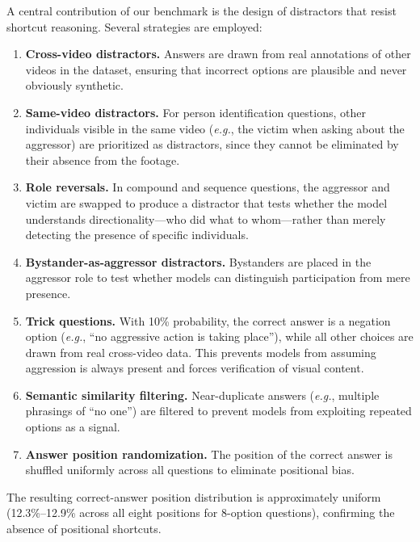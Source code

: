 \documentclass{article}
\begin{document}
A central contribution of our benchmark is the design of distractors that resist shortcut reasoning.
Several strategies are employed:
\begin{enumerate}
  \item \textbf{Cross-video distractors.} Answers are drawn from real annotations of other videos in the dataset, ensuring that incorrect options are plausible and never obviously synthetic.
  \item \textbf{Same-video distractors.} For person identification questions, other individuals visible in the same video (\textit{e.g.}, the victim when asking about the aggressor) are prioritized as distractors, since they cannot be eliminated by their absence from the footage.
  \item \textbf{Role reversals.} In compound and sequence questions, the aggressor and victim are swapped to produce a distractor that tests whether the model understands directionality---who did what to whom---rather than merely detecting the presence of specific individuals.
  \item \textbf{Bystander-as-aggressor distractors.} Bystanders are placed in the aggressor role to test whether models can distinguish participation from mere presence.
  \item \textbf{Trick questions.} With 10\% probability, the correct answer is a negation option (\textit{e.g.}, ``no aggressive action is taking place''), while all other choices are drawn from real cross-video data.
        This prevents models from assuming aggression is always present and forces verification of visual content.
  \item \textbf{Semantic similarity filtering.} Near-duplicate answers (\textit{e.g.}, multiple phrasings of ``no one'') are filtered to prevent models from exploiting repeated options as a signal.
  \item \textbf{Answer position randomization.} The position of the correct answer is shuffled uniformly across all questions to eliminate positional bias.
\end{enumerate}

The resulting correct-answer position distribution is approximately uniform (12.3\%--12.9\% across all eight positions for 8-option questions), confirming the absence of positional shortcuts.
\end{document}
